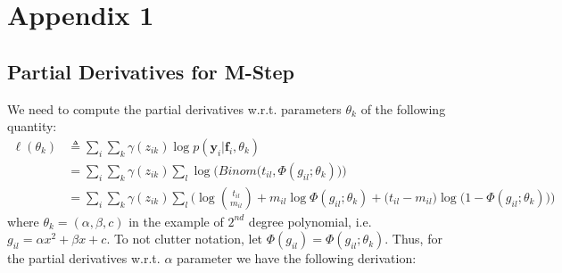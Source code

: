 \chapter{Appendix 1} \label{appendix1-ch}

\section{Partial Derivatives for M-Step} \label{derivatives-m-step-s}

We need to compute the partial derivatives w.r.t. parameters $\theta_{k}$ of the following quantity:
\begin{equation} \label{parameters-est2-EM-f-app}
  \begin{split}
	\ell(\theta_{k}) & \triangleq \sum_{i} \sum_{k} \gamma(z_{ik}) \log p(\mathbf{y}_{i}|\mathbf{f}_{i}, \theta_{k}) \\
					 & = \sum_{i} \sum_{k} \gamma(z_{ik}) \sum_{l} \log \bigg(Binom \big(t_{il}, \Phi(g_{il}; \theta_{k})\big) \bigg) \\
					 & =  \sum_{i} \sum_{k} \gamma(z_{ik}) \sum_{l} \bigg(\log \binom{t_{il}}{m_{il}} + m_{il} \log \Phi(g_{il}; \theta_{k}) + \big(t_{il} - m_{il} \big) \log \big(1 - \Phi(g_{il}; \theta_{k})\big)\bigg)
  \end{split}
\end{equation}
where $\theta_{k} = (\alpha, \beta, c)$ in the example of $2^{nd}$ degree polynomial, i.e. $g_{il} = \alpha x^{2} + \beta x + c$. To not clutter notation, let $\Phi(g_{il}) = \Phi(g_{il}; \theta_{k})$. Thus, for the partial derivatives w.r.t. $\alpha$ parameter we have the following derivation:

